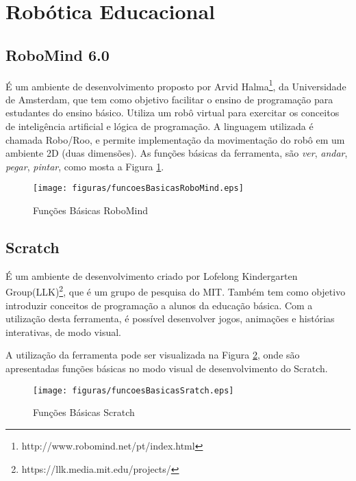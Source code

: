 \section{Robótica Educacional} %
\label{sec:robótica_educacional_suporte}

	\subsection{RoboMind 6.0} %
	\label{sub:robomind}

		É um ambiente de desenvolvimento proposto por Arvid Halma\footnote{http://www.robomind.net/pt/index.html}, da Universidade de Amsterdam, que tem como objetivo facilitar o ensino de programação para estudantes do ensino básico. Utiliza um robô virtual para exercitar os conceitos de inteligência artificial e lógica de programação. A linguagem utilizada é chamada Robo/Roo, e permite implementação da movimentação do robô em um ambiente 2D (duas dimensões). As funções básicas da ferramenta, são \textit{ver}, \textit{andar}, \textit{pegar}, \textit{pintar}, como mosta a Figura \ref{img:funcoesBasicasRoboMind}.

		\begin{figure}[H]
			\centering
			\texttt{[image: figuras/funcoesBasicasRoboMind.eps]}
			\caption[Funções Básicas RoboMind]{Funções Básicas RoboMind}
			\label{img:funcoesBasicasRoboMind}
		\end{figure}


	\subsection{Scratch} %
	\label{sub:scratch}

		É um ambiente de desenvolvimento criado por Lofelong Kindergarten Group(LLK)\footnote{https://llk.media.mit.edu/projects/}, que é um grupo de pesquisa do MIT. Também tem como objetivo introduzir conceitos de programação a alunos da educação básica. Com a utilização desta ferramenta, é possível desenvolver jogos, animações e histórias interativas, de modo visual.

		A utilização da ferramenta pode ser visualizada na Figura \ref{img:funcoesBasicasScratch}, onde são apresentadas funções básicas no modo visual de desenvolvimento do Scratch.

		\begin{figure}[H]
			\centering
			\texttt{[image: figuras/funcoesBasicasSratch.eps]}
			\caption[Funções Básicas Scratch]{Funções Básicas Scratch}
			\label{img:funcoesBasicasScratch}
		\end{figure}

